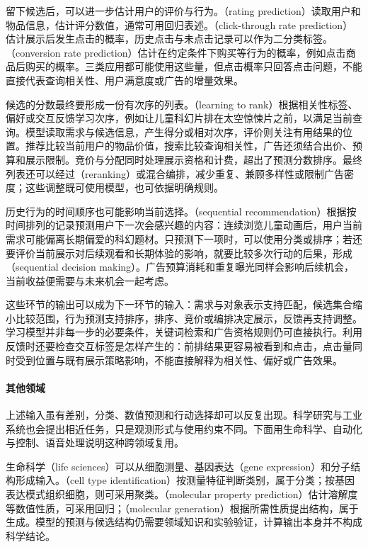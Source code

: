 留下候选后，可以进一步估计用户的评价与行为。（rating prediction）读取用户和物品信息，估计评分数值，通常可用回归表述。（click-through rate prediction）估计展示后发生点击的概率，历史点击与未点击记录可以作为二分类标签。（conversion rate prediction）估计在约定条件下购买等行为的概率，例如点击商品后购买的概率。三类应用都可能使用这些量，但点击概率只回答点击问题，不能直接代表查询相关性、用户满意度或广告的增量效果。

候选的分数最终要形成一份有次序的列表。（learning to rank）根据相关性标签、偏好或交互反馈学习次序，例如让儿童科幻片排在太空惊悚片之前，以满足当前查询。模型读取需求与候选信息，产生得分或相对次序，评价则关注有用结果的位置。推荐比较当前用户的物品价值，搜索比较查询相关性，广告还须结合出价、预算和展示限制。竞价与分配同时处理展示资格和计费，超出了预测分数排序。最终列表还可以经过（reranking）或混合编排，减少重复、兼顾多样性或限制广告密度；这些调整既可使用模型，也可依据明确规则。

历史行为的时间顺序也可能影响当前选择。（sequential recommendation）根据按时间排列的记录预测用户下一次会感兴趣的内容：连续浏览儿童动画后，用户当前需求可能偏离长期偏爱的科幻题材。只预测下一项时，可以使用分类或排序；若还要评价当前展示对后续观看和长期体验的影响，就要比较多次行动的后果，形成（sequential decision making）。广告预算消耗和重复曝光同样会影响后续机会，当前收益便需要与未来机会一起考虑。

这些环节的输出可以成为下一环节的输入：需求与对象表示支持匹配，候选集合缩小比较范围，行为预测支持排序，排序、竞价或编排决定展示，反馈再支持调整。学习模型并非每一步的必要条件，关键词检索和广告资格规则仍可直接执行。利用反馈时还要检查交互标签是怎样产生的：前排结果更容易被看到和点击，点击量同时受到位置与既有展示策略影响，不能直接解释为相关性、偏好或广告效果。

\paragraph{其他领域}
上述输入虽有差别，分类、数值预测和行动选择却可以反复出现。科学研究与工业系统也会提出相近任务，只是观测形式与使用约束不同。下面用生命科学、自动化与控制、语音处理说明这种跨领域复用。

生命科学（life sciences）可以从细胞测量、基因表达（gene expression）和分子结构形成输入。（cell type identification）按测量特征判断类别，属于分类；按基因表达模式组织细胞，则可采用聚类。（molecular property prediction）估计溶解度等数值性质，可采用回归；（molecular generation）根据所需性质提出结构，属于生成。模型的预测与候选结构仍需要领域知识和实验验证，计算输出本身并不构成科学结论。

